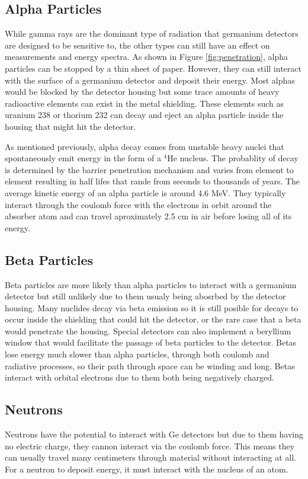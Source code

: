 \subsection{Alpha Particles}
While gamma rays are the dominant type of radiation that germanium detectors are designed to be sensitive to, the other types can still have an effect on measurements and energy spectra.
As shown in Figure \ref{fig:penetration}, alpha particles can be stopped by a thin sheet of paper.
However, they can still interact with the surface of a germanium detector and deposit their energy.
Most alphas would be blocked by the detector housing but some trace amounts of heavy radioactive elements can exist in the metal shielding.
These elements such as uranium 238 or thorium 232 can decay and eject an alpha particle inside the housing that might hit the detector.

As mentioned previously, alpha decay comes from unstable heavy nuclei that spontaneously emit energy in the form of a $^{4}$He nucleus.
The probablity of decay is determined by the barrier penetration mechanism and varies from element to element resulting in half lifes that rande from seconds to thousands of years.
The average kinetic energy of an alpha particle is around 4.6 MeV.
They typically interact through the coulomb force with the electrons in orbit around the absorber atom and can travel aproximately 2.5 cm in air before losing all of its energy.

\subsection{Beta Particles}
Beta particles are more likely than alpha particles to interact with a germanium detector but still unlikely due to them usualy being abosrbed by the detector housing.
Many nuclides decay via beta emission so it is still posible for decays to occur inside the shielding that could hit the detector, or the rare case that a beta would penetrate the housing.
Special detectors can also implement a beryllium window that would facilitate the passage of beta particles to the detector.
Betas lose energy much slower than alpha particles, through both coulomb and radiative processes, so their path through space can be winding and long.
Betas interact with orbital electrons due to them both being negatively charged.


\subsection{Neutrons}
Neutrons have the potential to interact with Ge detectors but due to them having no electric charge, they cannon interact via the coulomb force.
This means they can usually travel many centimeters through material without interacting at all.
For a neutron to deposit energy, it must interact with the nucleus of an atom.

